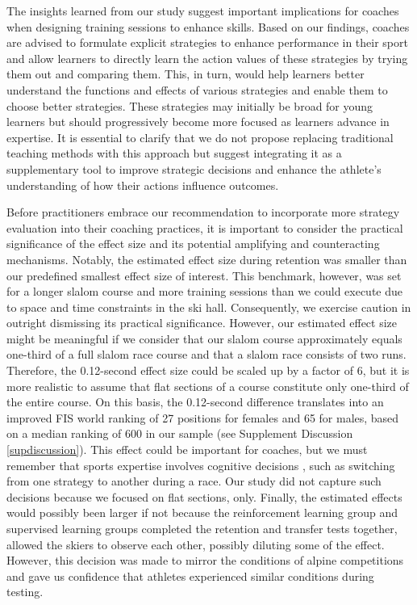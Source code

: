 \documentclass[pdflatex,sn-mathphys-num]{sn-jnl}%
\theoremstyle{thmstyleone}%
\theoremstyle{thmstyletwo}%
\theoremstyle{thmstylethree}%
\begin{document}
The insights learned from our study suggest important implications for coaches when designing training sessions to enhance skills. Based on our findings, coaches are advised to formulate explicit strategies to enhance performance in their sport and allow learners to directly learn the action values of these strategies by trying them out and comparing them. This, in turn, would help learners better understand the functions and effects of various strategies and enable them to choose better strategies. These strategies may initially be broad for young learners but should progressively become more focused as learners advance in expertise. It is essential to clarify that we do not propose replacing traditional teaching methods with this approach but suggest integrating it as a supplementary tool to improve strategic decisions and enhance the athlete's understanding of how their actions influence outcomes.

Before practitioners embrace our recommendation to incorporate more strategy evaluation into their coaching practices, it is important to consider the practical significance of the effect size and its potential amplifying and counteracting mechanisms\cite{anvari_not_2023}. Notably, the estimated effect size during retention was smaller than our predefined smallest effect size of interest. This benchmark, however, was set for a longer slalom course and more training sessions than we could execute due to space and time constraints in the ski hall. Consequently, we exercise caution in outright dismissing its practical significance. However, our estimated effect size might be meaningful if we consider that our slalom course approximately equals one-third of a full slalom race course and that a slalom race consists of two runs. Therefore, the 0.12-second effect size could be scaled up by a factor of 6, but it is more realistic to assume that flat sections of a course constitute only one-third of the entire course. On this basis, the 0.12-second difference translates into an improved FIS world ranking of 27 positions for females and 65 for males, based on a median ranking of 600 in our sample (see Supplement Discussion \ref{supdiscussion}). This effect could be important for coaches, but we must remember that sports expertise involves cognitive decisions  \cite{mangalam_investigating_2023, krakauer_motor_2019}, such as switching from one strategy to another during a race. Our study did not capture such decisions because we focused on flat sections, only. Finally, the estimated effects would possibly been larger if not because the reinforcement learning group and supervised learning groups completed the retention and transfer tests together, allowed the skiers to observe each other, possibly diluting some of the effect. However, this decision was made to mirror the conditions of alpine competitions and gave us confidence that athletes experienced similar conditions during testing.
\end{document}
